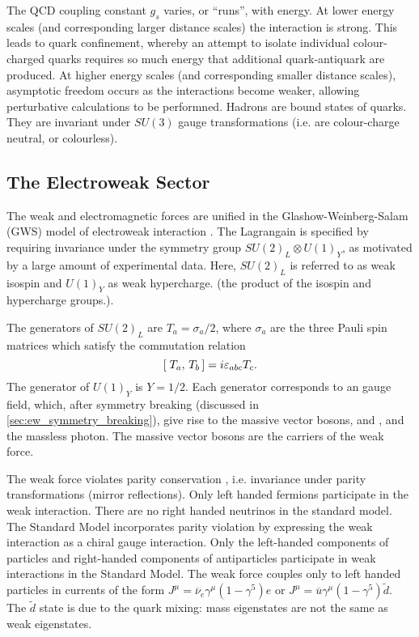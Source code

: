 The QCD coupling constant $g_s$ varies, or ``runs'', with energy.
At lower energy scales (and corresponding larger distance scales) the interaction is strong.
This leads to quark confinement, whereby an attempt to isolate individual colour-charged quarks requires so much energy that additional quark-antiquark are produced.
At higher energy scales (and corresponding smaller distance scales), asymptotic freedom occurs as the interactions become weaker, allowing perturbative calculations to be performned.
Hadrons are bound states of quarks.
They are invariant under $SU(3)$ gauge transformations (i.e. are colour-charge neutral, or colourless).


\subsection{The Electroweak Sector}\label{sec:ew_sector}

The weak and electromagnetic forces are unified in the Glashow-Weinberg-Salam (GWS) model of electroweak interaction \cite{Glashow:1961tr,Weinberg:1967tq,Salam:1968rm}.
The Lagrangain is specified by requiring invariance under the symmetry group $SU(2)_L \otimes U(1)_Y$, as motivated by a large amount of experimental data.
Here, $SU(2)_L$ is referred to as weak isospin and $U(1)_Y$ as weak hypercharge. (the product of the isospin and hypercharge groups.).

The generators of $SU(2)_L$ are $T_a = \sigma_a/2$, where $\sigma_a$ are the three Pauli spin matrices which satisfy the commutation relation 
%
\begin{equation}
[\; T_a,\,T_b\,] = i \varepsilon_{abc} T_c .
\end{equation}
%
The generator of $U(1)_Y$ is $Y = 1/2$.
Each generator corresponds to an gauge field, which, after symmetry breaking (discussed in \cref{sec:ew_symmetry_breaking}), give rise to the massive vector bosons, \Wpm and \Zboson, and the massless photon.
The massive vector bosons are the carriers of the weak force.

The weak force violates parity conservation \cite{PhysRev.104.254,PhysRev.105.1413,PhysRev.105.1415}, i.e. invariance under parity transformations (mirror reflections).
Only left handed fermions participate in the weak interaction.
There are no right handed neutrinos in the standard model.
The Standard Model incorporates parity violation by expressing the weak interaction as a chiral gauge interaction. Only the left-handed components of particles and right-handed components of antiparticles participate in weak interactions in the Standard Model. The weak force couples only to left handed particles in currents of the form $J^\mu = \overline{\nu}_e \gamma^\mu (1 - \gamma^5) e$ or $J^\mu = \overline{u} \gamma^\mu (1 - \gamma^5) \tilde{d}$. The $\tilde{d}$ state is due to the quark mixing: mass eigenstates are not the same as weak eigenstates.

